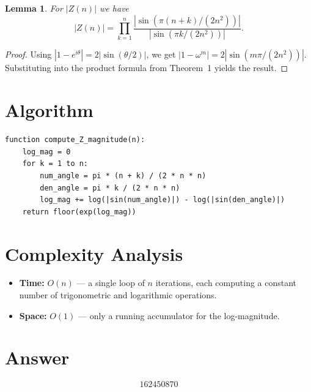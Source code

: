 \documentclass[11pt]{article}
\newtheorem{lemma}[theorem]{Lemma}
\begin{document}
\begin{lemma}
For $|Z(n)|$ we have
\[
|Z(n)| = \prod_{k=1}^{n} \frac{|\sin(\pi(n+k)/(2n^2))|}{|\sin(\pi k/(2n^2))|}.
\]
\end{lemma}

\begin{proof}
Using $|1 - e^{i\theta}| = 2|\sin(\theta/2)|$, we get $|1-\omega^m| = 2|\sin(m\pi/(2n^2))|$. Substituting into the product formula from Theorem~1 yields the result.
\end{proof}

\section{Algorithm}

\begin{verbatim}
function compute_Z_magnitude(n):
    log_mag = 0
    for k = 1 to n:
        num_angle = pi * (n + k) / (2 * n * n)
        den_angle = pi * k / (2 * n * n)
        log_mag += log(|sin(num_angle)|) - log(|sin(den_angle)|)
    return floor(exp(log_mag))
\end{verbatim}

\section{Complexity Analysis}

\begin{itemize}
    \item \textbf{Time:} $O(n)$ --- a single loop of $n$ iterations, each computing a constant number of trigonometric and logarithmic operations.
    \item \textbf{Space:} $O(1)$ --- only a running accumulator for the log-magnitude.
\end{itemize}

\section{Answer}

\[
\boxed{162450870}
\]
\end{document}
